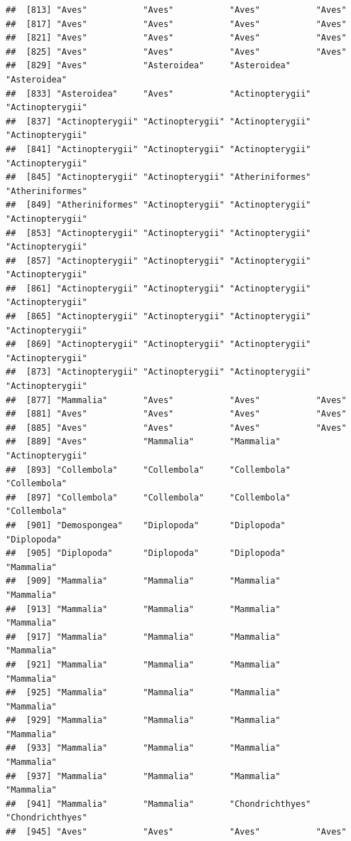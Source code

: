 \documentclass[
]{article}
\begin{document}
\begin{verbatim}
##  [813] "Aves"           "Aves"           "Aves"           "Aves"          
##  [817] "Aves"           "Aves"           "Aves"           "Aves"          
##  [821] "Aves"           "Aves"           "Aves"           "Aves"          
##  [825] "Aves"           "Aves"           "Aves"           "Aves"          
##  [829] "Aves"           "Asteroidea"     "Asteroidea"     "Asteroidea"    
##  [833] "Asteroidea"     "Aves"           "Actinopterygii" "Actinopterygii"
##  [837] "Actinopterygii" "Actinopterygii" "Actinopterygii" "Actinopterygii"
##  [841] "Actinopterygii" "Actinopterygii" "Actinopterygii" "Actinopterygii"
##  [845] "Actinopterygii" "Actinopterygii" "Atheriniformes" "Atheriniformes"
##  [849] "Atheriniformes" "Actinopterygii" "Actinopterygii" "Actinopterygii"
##  [853] "Actinopterygii" "Actinopterygii" "Actinopterygii" "Actinopterygii"
##  [857] "Actinopterygii" "Actinopterygii" "Actinopterygii" "Actinopterygii"
##  [861] "Actinopterygii" "Actinopterygii" "Actinopterygii" "Actinopterygii"
##  [865] "Actinopterygii" "Actinopterygii" "Actinopterygii" "Actinopterygii"
##  [869] "Actinopterygii" "Actinopterygii" "Actinopterygii" "Actinopterygii"
##  [873] "Actinopterygii" "Actinopterygii" "Actinopterygii" "Actinopterygii"
##  [877] "Mammalia"       "Aves"           "Aves"           "Aves"          
##  [881] "Aves"           "Aves"           "Aves"           "Aves"          
##  [885] "Aves"           "Aves"           "Aves"           "Aves"          
##  [889] "Aves"           "Mammalia"       "Mammalia"       "Actinopterygii"
##  [893] "Collembola"     "Collembola"     "Collembola"     "Collembola"    
##  [897] "Collembola"     "Collembola"     "Collembola"     "Collembola"    
##  [901] "Demospongea"    "Diplopoda"      "Diplopoda"      "Diplopoda"     
##  [905] "Diplopoda"      "Diplopoda"      "Diplopoda"      "Mammalia"      
##  [909] "Mammalia"       "Mammalia"       "Mammalia"       "Mammalia"      
##  [913] "Mammalia"       "Mammalia"       "Mammalia"       "Mammalia"      
##  [917] "Mammalia"       "Mammalia"       "Mammalia"       "Mammalia"      
##  [921] "Mammalia"       "Mammalia"       "Mammalia"       "Mammalia"      
##  [925] "Mammalia"       "Mammalia"       "Mammalia"       "Mammalia"      
##  [929] "Mammalia"       "Mammalia"       "Mammalia"       "Mammalia"      
##  [933] "Mammalia"       "Mammalia"       "Mammalia"       "Mammalia"      
##  [937] "Mammalia"       "Mammalia"       "Mammalia"       "Mammalia"      
##  [941] "Mammalia"       "Mammalia"       "Chondrichthyes" "Chondrichthyes"
##  [945] "Aves"           "Aves"           "Aves"           "Aves"          

\end{verbatim}
\end{document}
